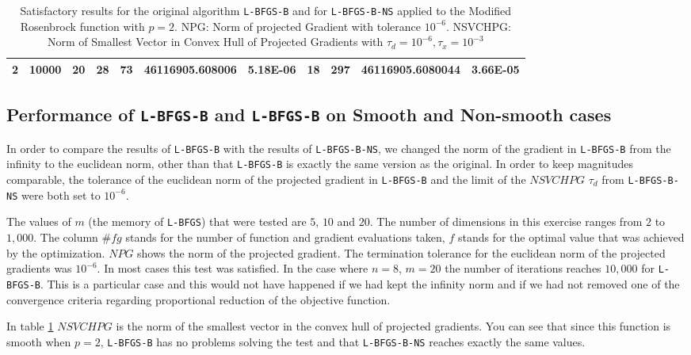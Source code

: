 \begin{center}
\begin{table}
\begin{center}
\begin{tabular}{|l|l|l|l|l|l|l|l|l|l|l|}
      2 & 10000 & 20 & 28 & 73 & 46116905.608006 & 5.18E-06 & 18 & 297 & 46116905.6080044 & 3.66E-05\\
      \hline
      \end{tabular}
      \caption[Modified Rosenbrock with $p = 2$]{Satisfactory results for the original algorithm \texttt{L-BFGS-B}  and for \texttt{L-BFGS-B-NS} applied to the Modified Rosenbrock function with $p = 2$. NPG: Norm of projected Gradient with tolerance $10^{-6}$. 
NSVCHPG: Norm of Smallest Vector in Convex Hull of Projected Gradients with $\tau_d = 10^{-6}, \tau_x = 10^{-3}$}
      \label{pequal2}
    \end{center}
  \end{table}
\end{center}

\subsection{Performance of \texttt{L-BFGS-B} and  \texttt{L-BFGS-B} on Smooth and Non-smooth cases}

In order to compare the results of \texttt{L-BFGS-B} with the results of \texttt{L-BFGS-B-NS}, we changed the norm of the gradient in \texttt{L-BFGS-B} from the infinity to the euclidean norm, other than that \texttt{L-BFGS-B} is exactly the same version as the original. In order to keep magnitudes comparable, the tolerance of the euclidean norm of the projected gradient in \texttt{L-BFGS-B} and the limit of the $NSVCHPG$ $\tau_d$ from \texttt{L-BFGS-B-NS} were both set to $10^{-6}$.

The values of $m$ (the memory of \texttt{L-BFGS}) that were tested are $5$, $10$ and $20$. The number of dimensions in this exercise ranges from $2$ to $1,000$. The column $\#fg$ stands for the number of function and gradient evaluations taken, $f$ stands for the optimal value that was achieved by the optimization. $NPG$ shows the norm of the projected gradient. The termination tolerance for the euclidean norm of the projected gradients was $10^{-6}$. In most cases this test was satisfied. In the case where $n=8$, $m = 20$ the number of iterations reaches $10,000$ for \texttt{L-BFGS-B}. This is a particular case and this would not have happened if we had kept the infinity norm and if we had not removed one of the convergence criteria regarding proportional reduction of the objective function.

In table \ref{pequal2} $NSVCHPG$ is the norm of the smallest vector in the convex hull of projected gradients. You can see that since this function is smooth when $p = 2$, \texttt{L-BFGS-B} has no problems solving the test and that \texttt{L-BFGS-B-NS} reaches exactly the same values.

